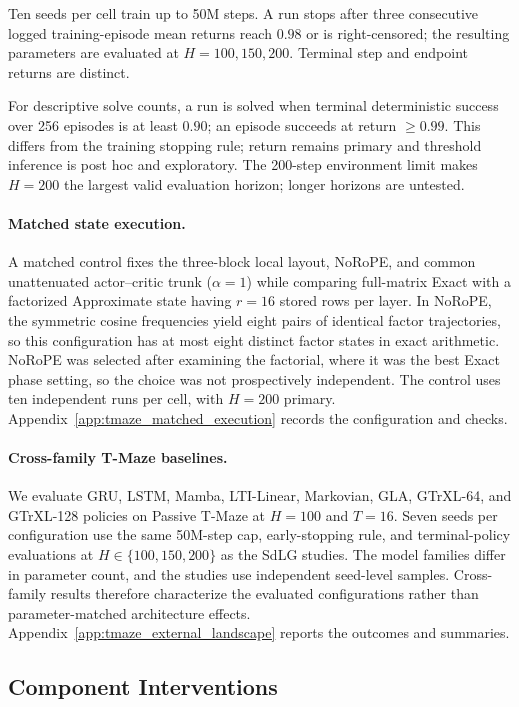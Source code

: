 Ten seeds per cell train up to 50M steps. A run stops after three consecutive logged training-episode mean returns reach $0.98$ or is right-censored; the resulting parameters are evaluated at $H=100,150,200$. Terminal step and endpoint returns are distinct.

For descriptive solve counts, a run is solved when terminal deterministic success over 256 episodes is at least $0.90$; an episode succeeds at return $\geq0.99$. This differs from the training stopping rule; return remains primary and threshold inference is post hoc and exploratory. The 200-step environment limit makes $H=200$ the largest valid evaluation horizon; longer horizons are untested.

\paragraph{Matched state execution.}
A matched control fixes the three-block local layout, NoRoPE, and common unattenuated actor--critic trunk ($\alpha=1$) while comparing full-matrix Exact with a factorized Approximate state having $r=16$ stored rows per layer. In NoRoPE, the symmetric cosine frequencies yield eight pairs of identical factor trajectories, so this configuration has at most eight distinct factor states in exact arithmetic. NoRoPE was selected after examining the factorial, where it was the best Exact phase setting, so the choice was not prospectively independent. The control uses ten independent runs per cell, with $H=200$ primary. Appendix~\ref{app:tmaze_matched_execution} records the configuration and checks.

\paragraph{Cross-family T-Maze baselines.}
We evaluate GRU, LSTM, Mamba, LTI-Linear, Markovian, GLA, GTrXL-64, and GTrXL-128 policies on Passive T-Maze at $H=100$ and $T=16$. Seven seeds per configuration use the same 50M-step cap, early-stopping rule, and terminal-policy evaluations at $H\in\{100,150,200\}$ as the SdLG studies. The model families differ in parameter count, and the studies use independent seed-level samples. Cross-family results therefore characterize the evaluated configurations rather than parameter-matched architecture effects. Appendix~\ref{app:tmaze_external_landscape} reports the outcomes and summaries.

\subsection{Component Interventions}

